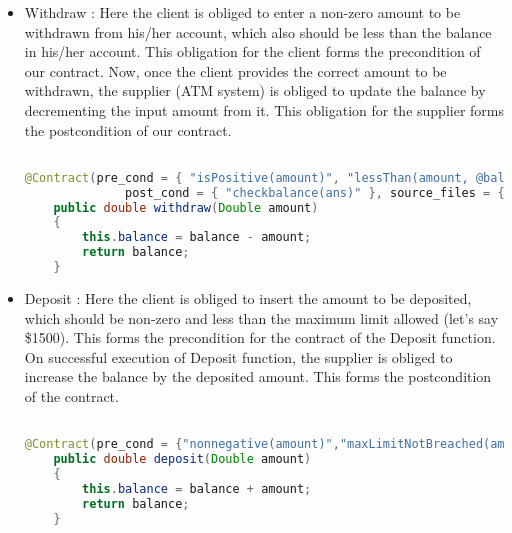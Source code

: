 \begin{itemize}
\item Withdraw :
Here the client is obliged to enter a non-zero amount to be withdrawn from his/her account, which also should be less than the balance in his/her account. This obligation for the client forms the precondition of our contract.
Now, once the client provides the correct amount to be withdrawn, the supplier (ATM system) is obliged to update the balance by decrementing the input amount from it. This obligation for the supplier forms the postcondition of our contract.
\linebreak


\begin{minipage}{\linewidth}
\begin{lstlisting}[frame=single, language=Java, caption={Withdraw Contract Example}, label={WithdrawExample}, captionpos=b, breaklines=true]

@Contract(pre_cond = { "isPositive(amount)", "lessThan(amount, @balance)" }, 
			  post_cond = { "checkbalance(ans)" }, source_files = { "bankprolog.pl" })
	public double withdraw(Double amount)
	{
		this.balance = balance - amount;
		return balance;
	}
\end{lstlisting}
\end{minipage}

\newpage

\item Deposit :
Here the client is obliged to insert the amount to be deposited, which should be non-zero and less than the maximum limit allowed (let's say \$1500). This forms the precondition for the contract of the Deposit function.
On successful execution of Deposit function, the supplier is obliged to increase the balance by the deposited amount. This forms the postcondition of the contract.
\linebreak


\begin{minipage}{\linewidth}
\begin{lstlisting}[frame=single, language=Java, caption={Withdraw Contract Example}, label={WithdrawExample}, captionpos=b, breaklines=true]

@Contract(pre_cond = {"nonnegative(amount)","maxLimitNotBreached(amount)"},post_cond = { "checkbalance(ans)" }, source_files = { "bankprolog.pl" })
	public double deposit(Double amount)
	{
		this.balance = balance + amount;
		return balance;
	} 
\end{lstlisting}
\end{minipage}
      
\end{itemize}


